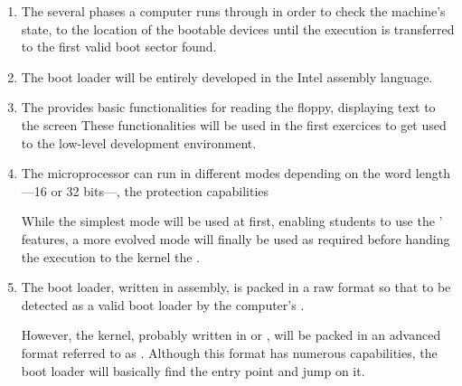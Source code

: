 \begin{enumerate}
  \item

    \-

    The several phases a computer runs through in order to check the
    machine's state, to the location of the bootable devices until the
    execution is transferred to the first valid boot sector found.
  \item

    The boot loader will be entirely developed in the Intel 
    assembly language.
  \item

    The  provides basic functionalities for reading the floppy,
    displaying text to the screen \etc{} These functionalities will be used
    in the first exercices to get used to the low-level development
    environment.
  \item

    The  microprocessor can run in different modes depending on
    the word length---16 or 32 bits---, the protection capabilities \etc{}

    \-

    While the simplest mode will be used at first, enabling students to
    use the ' features, a more evolved mode will finally be used
    as required before handing the execution to the kernel \ie{} the
    .
  \item

    The boot loader, written in assembly, is packed in a raw format so that
    to be detected as a valid boot loader by the computer's .

    \-

    However, the kernel, probably written in  or , will
    be packed in an advanced format referred to as . Although this
    format has numerous capabilities, the boot loader will basically
    find the entry point and jump on it.
\end{enumerate}

\newpage

%
%

%
%

